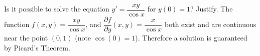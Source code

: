 {Is it possible to solve the equation $y' = \dfrac{xy}{\cos x}$ for $y(0) = 1$?
Justify.}
{The function $f(x,y) = \dfrac{xy}{\cos x}$, and $\dfrac{\partial f}{\partial y}(x,y) = \dfrac{x}{\cos x}$ both exist and are continuous near the point $(0,1)$ (note $\cos(0)=1$). Therefore a solution is guaranteed by Picard's Theorem.}